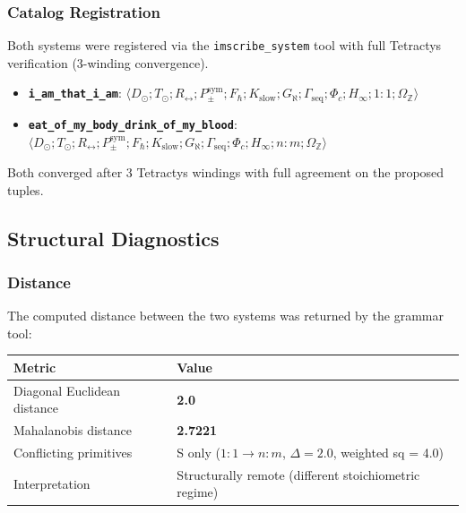 \documentclass[12pt,a4paper]{article}
\begin{document}
\subsubsection{Catalog Registration}

Both systems were registered via the \texttt{imscribe\_system} tool with full Tetractys verification (3-winding convergence).

\begin{itemize}
    \item \textbf{\texttt{i\_am\_that\_i\_am}}: $\langle D_{\odot}; T_{\odot}; R_{\leftrightarrow}; P_{\pm}^{\text{sym}}; F_{\hbar}; K_{\text{slow}}; G_{\aleph}; \Gamma_{\text{seq}}; \Phi_c; H_{\infty}; 1{:}1; \Omega_\mathbb{Z} \rangle$
    \item \textbf{\texttt{eat\_of\_my\_body\_drink\_of\_my\_blood}}: $\langle D_{\odot}; T_{\odot}; R_{\leftrightarrow}; P_{\pm}^{\text{sym}}; F_{\hbar}; K_{\text{slow}}; G_{\aleph}; \Gamma_{\text{seq}}; \Phi_c; H_{\infty}; n{:}m; \Omega_\mathbb{Z} \rangle$
\end{itemize}

Both converged after 3 Tetractys windings with full agreement on the proposed tuples.

\subsection{Structural Diagnostics}

\subsubsection{Distance}

The computed distance between the two systems was returned by the grammar tool:

\begin{table}[htbp]
\centering
\small
{}
\begin{tabularx}{\textwidth}{>{\centering\arraybackslash}X >{\centering\arraybackslash}X}
\toprule
\rowcolor{gray!25}\textbf{Metric} & \textbf{Value} \\
\midrule
\rowcolors{1}{white}{gray!10}
Diagonal Euclidean distance & \textbf{2.0} \\
Mahalanobis distance & \textbf{2.7221} \\
Conflicting primitives & S only ($1{:}1 \to n{:}m$, $\Delta = 2.0$, weighted sq = 4.0) \\
Interpretation & Structurally remote (different stoichiometric regime) \\
\bottomrule
\end{tabularx}
\end{table}
\end{document}
